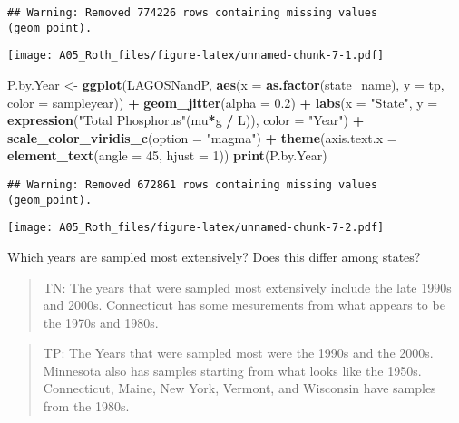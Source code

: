 \documentclass[]{article}
\newenvironment{Shaded}{\begin{snugshade}}{\end{snugshade}}
\newcommand{\DataTypeTok}[1]{\textcolor[rgb]{0.13,0.29,0.53}{#1}}
\newcommand{\DecValTok}[1]{\textcolor[rgb]{0.00,0.00,0.81}{#1}}
\newcommand{\FloatTok}[1]{\textcolor[rgb]{0.00,0.00,0.81}{#1}}
\newcommand{\KeywordTok}[1]{\textcolor[rgb]{0.13,0.29,0.53}{\textbf{#1}}}
\newcommand{\NormalTok}[1]{#1}
\newcommand{\OperatorTok}[1]{\textcolor[rgb]{0.81,0.36,0.00}{\textbf{#1}}}
\newcommand{\StringTok}[1]{\textcolor[rgb]{0.31,0.60,0.02}{#1}}
\begin{document}
\begin{verbatim}
## Warning: Removed 774226 rows containing missing values (geom_point).
\end{verbatim}

\texttt{[image: A05\_Roth\_files/figure-latex/unnamed-chunk-7-1.pdf]}

\begin{Shaded}
\begin{Highlighting}[]
\NormalTok{P.by.Year <-}\StringTok{  }
\KeywordTok{ggplot}\NormalTok{(LAGOSNandP, }
       \KeywordTok{aes}\NormalTok{(}\DataTypeTok{x =} \KeywordTok{as.factor}\NormalTok{(state_name), }\DataTypeTok{y =}\NormalTok{ tp, }\DataTypeTok{color =}\NormalTok{ sampleyear)) }\OperatorTok{+}
\StringTok{  }\KeywordTok{geom_jitter}\NormalTok{(}\DataTypeTok{alpha =} \FloatTok{0.2}\NormalTok{) }\OperatorTok{+}\StringTok{ }
\StringTok{  }\KeywordTok{labs}\NormalTok{(}\DataTypeTok{x =} \StringTok{"State"}\NormalTok{, }\DataTypeTok{y =} \KeywordTok{expression}\NormalTok{(}\StringTok{"Total Phosphorus"}\NormalTok{(mu}\OperatorTok{*}\NormalTok{g }\OperatorTok{/}\StringTok{ }\NormalTok{L)), }\DataTypeTok{color =} \StringTok{"Year"}\NormalTok{) }\OperatorTok{+}
\StringTok{  }\KeywordTok{scale_color_viridis_c}\NormalTok{(}\DataTypeTok{option =} \StringTok{"magma"}\NormalTok{) }\OperatorTok{+}
\StringTok{  }\KeywordTok{theme}\NormalTok{(}\DataTypeTok{axis.text.x =} \KeywordTok{element_text}\NormalTok{(}\DataTypeTok{angle =} \DecValTok{45}\NormalTok{, }\DataTypeTok{hjust =} \DecValTok{1}\NormalTok{))}
\KeywordTok{print}\NormalTok{(P.by.Year)}
\end{Highlighting}
\end{Shaded}

\begin{verbatim}
## Warning: Removed 672861 rows containing missing values (geom_point).
\end{verbatim}

\texttt{[image: A05\_Roth\_files/figure-latex/unnamed-chunk-7-2.pdf]}

Which years are sampled most extensively? Does this differ among states?

\begin{quote}
TN: The years that were sampled most extensively include the late 1990s
and 2000s. Connecticut has some mesurements from what appears to be the
1970s and 1980s.
\end{quote}

\begin{quote}
TP: The Years that were sampled most were the 1990s and the 2000s.
Minnesota also has samples starting from what looks like the 1950s.
Connecticut, Maine, New York, Vermont, and Wisconsin have samples from
the 1980s.
\end{quote}
\end{document}
